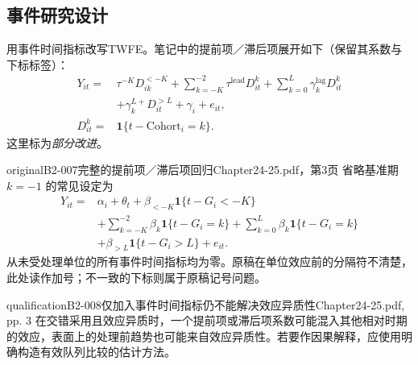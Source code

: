 \subsection{事件研究设计}
用事件时间指标改写TWFE。笔记中的提前项／滞后项展开如下（保留其系数与下标标签）：
\begin{align*}
Y_{it}={}&\tau^{-K}D_{ik}^{<-K}
 +\sum_{k=-K}^{-2}\tau^{\mathrm{lead}}D_{it}^{k}
 +\sum_{k=0}^{L}\gamma_k^{\mathrm{lag}}D_{it}^{k}\\
 &+\gamma_k^{L+}D_{it}^{>L}+\gamma_i+e_{it},\\
D_{it}^{k}={}&\mathbf1\{t-\mathrm{Cohort}_i=k\}.
\end{align*}
这里标为\emph{部分改进}。\begin{reviewnote}{original}{B2-007}{完整的提前项／滞后项回归}{Chapter24-25.pdf，第3页}
省略基准期 \(k=-1\) 的常见设定为
\begin{align*}
Y_{it}={}&\alpha_i+\theta_t+\beta_{<-K}\mathbf1\{t-G_i<-K\}\\
&+\sum_{k=-K}^{-2}\beta_k\mathbf1\{t-G_i=k\}
+\sum_{k=0}^{L}\beta_k\mathbf1\{t-G_i=k\}\\
&+\beta_{>L}\mathbf1\{t-G_i>L\}+e_{it}.
\end{align*}
从未受处理单位的所有事件时间指标均为零。原稿在单位效应前的分隔符不清楚，此处读作加号；不一致的下标则属于原稿记号问题。
\par{}
\end{reviewnote}
\begin{reviewnote}{qualification}{B2-008}{仅加入事件时间指标仍不能解决效应异质性}{Chapter24-25.pdf, pp. 3}
在交错采用且效应异质时，一个提前项或滞后项系数可能混入其他相对时期的效应，表面上的处理前趋势也可能来自效应异质性。若要作因果解释，应使用明确构造有效队列比较的估计方法。
\par{}
\end{reviewnote}


